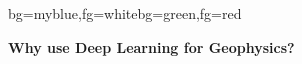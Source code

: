 {
\begin{frame}[plain]
\begin{variableblock}{}{bg=myblue,fg=white}{bg=green,fg=red}
\begin{center}
\textbf{Why use Deep Learning for Geophysics?}
\end{center}
\end{variableblock}
\end{frame}
}